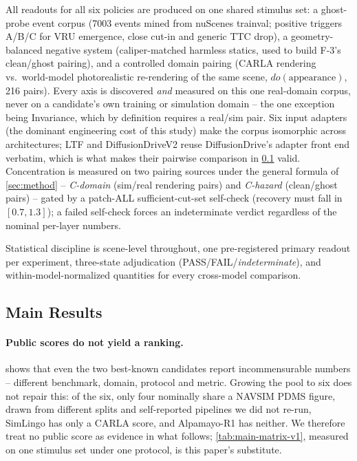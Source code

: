 All readouts for all six policies are produced on one shared stimulus set: a ghost-probe
event corpus (7003 events mined from nuScenes trainval; positive triggers A/B/C for VRU
emergence, close cut-in and generic TTC drop), a geometry-balanced negative system
(caliper-matched harmless statics, used to build F-3's clean/ghost pairing), and
a controlled domain pairing (CARLA rendering vs.\ world-model photorealistic
re-rendering of the same scene, $do(\text{appearance})$, 216 pairs). Every axis is
discovered \emph{and} measured on this one real-domain corpus, never on a candidate's own
training or simulation domain -- the one exception being Invariance, which by definition
requires a real/sim pair. Six input adapters (the dominant engineering cost of this
study) make the corpus isomorphic across architectures; LTF and DiffusionDriveV2 reuse
DiffusionDrive's adapter front end verbatim, which is what makes their pairwise
comparison in \cref{sec:main-results} valid. Concentration is measured on two pairing
sources under the general formula of \cref{sec:method} -- \emph{C-domain} (sim/real
rendering pairs) and \emph{C-hazard} (clean/ghost pairs) -- gated by a patch-ALL
sufficient-cut-set self-check (recovery must fall in $[0.7,1.3]$); a failed self-check
forces an indeterminate verdict regardless of the nominal per-layer numbers.

Statistical discipline is scene-level throughout, one pre-registered primary readout per
experiment, three-state adjudication (PASS/FAIL/\emph{indeterminate}), and
within-model-normalized quantities for every cross-model comparison.

\subsection{Main Results}
\label{sec:main-results}

\paragraph{Public scores do not yield a ranking.}  shows
that even the two best-known candidates report incommensurable numbers -- different
benchmark, domain, protocol and metric. Growing the pool to six does not repair this: of
the six, only four nominally share a NAVSIM PDMS figure, drawn from different splits and
self-reported pipelines we did not re-run, SimLingo has only a CARLA score, and
Alpamayo-R1 has neither. We therefore treat no public score as evidence in what follows;
\cref{tab:main-matrix-v1}, measured on one stimulus set under one protocol, is this paper's
substitute.

